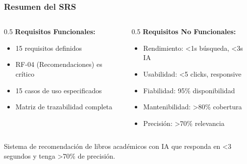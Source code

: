 \documentclass[aspectratio=169]{beamer}
\begin{document}
\begin{frame}
\frametitle{Resumen del SRS}

\begin{columns}
\begin{column}{0.5\textwidth}
\textbf{Requisitos Funcionales:}
\begin{itemize}
\item 15 requisitos definidos
\item RF-04 (Recomendaciones) es crítico
\item 15 casos de uso especificados
\item Matriz de trazabilidad completa
\end{itemize}
\end{column}

\begin{column}{0.5\textwidth}
\textbf{Requisitos No Funcionales:}
\begin{itemize}
\item Rendimiento: <1s búsqueda, <3s IA
\item Usabilidad: <5 clicks, responsive
\item Fiabilidad: 95\% disponibilidad
\item Mantenibilidad: >80\% cobertura
\item Precisión: >70\% relevancia
\end{itemize}
\end{column}
\end{columns}

\vspace{0.5cm}

\begin{tcolorbox}[colback=blue!5, colframe=blue!50, title=Objetivo Principal]
Sistema de recomendación de libros académicos con IA que responda en <3 segundos y tenga >70\% de precisión.
\end{tcolorbox}

\end{frame}
\end{document}
